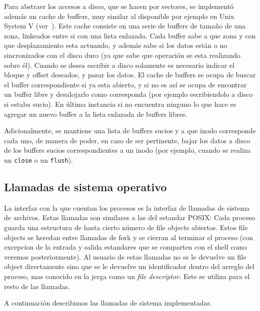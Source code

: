Para abstraer los accesos a disco, que se hacen por sectores, se implement\'o adem\'as un cache de buffers, muy similar al disponible por
ejemplo en Unix System V (ver~\cite{systemv}). Este cache consiste en una serie de buffers de tama\~no de una zona, linkeados entre si con
una lista enlazada. Cada buffer sabe a que zona y con que desplazamiento esta actuando, y adem\'as sabe si los datos est\'an o no sincronizados
con el disco duro (ya que sabe que operaci\'on se esta realizando sobre \'el). Cuando se desea escribir a disco solamente es necesario indicar
el bloque y offset deseados, y pasar los datos. El cache de buffers se ocupa de buscar el buffer correspondiente si ya esta abierto, y si no
es as\'i se ocupa de encontrar un buffer libre y desalojarlo como corresponda (por ejemplo escribiendolo a disco si estaba sucio). En \'ultima
instancia si no encuentra ninguno lo que hace es agregar un nuevo buffer a la lista enlazada de buffers libres.

Adicionalmente, se mantiene una lista de buffers sucios y a que inodo corresponde cada uno, de manera de poder, en caso de ser pertinente, bajar
los datos a disco de los buffers sucios correspondientes a un inodo (por ejemplo, cuando se realiza un \texttt{close} o un \texttt{flush}).

\subsection{Llamadas de sistema operativo}
\label{sec::filesystem_syscalls}

La interfaz con la que cuentan los procesos es la interfaz de llamadas de sistema de archivos. Estas llamadas son similares a las del estandar
POSIX: Cada proceso guarda una estructura de hasta cierto n\'umero de file objects abiertos. Estos file objects se heredan entre llamadas de
fork y se cierran al terminar el proceso (con excepcion de la entrada y salida estandares que se comparten con el shell como veremos
posteriormente). Al usuario de estas llamadas no se le devuelve un file object directamente sino que se le devuelve un identificador dentro del
arreglo del proceso, mas conocido en la jerga como un \textit{file descriptor}. Este se utiliza para el resto de las llamadas.

A continuaci\'on describimos las llamadas de sistema implementadas.

